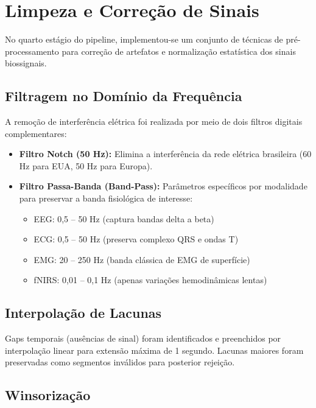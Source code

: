 \section{Limpeza e Correção de Sinais}
\label{sec:metodo_limpeza}

No quarto estágio do pipeline, implementou-se um conjunto de técnicas de pré-processamento para correção de artefatos e normalização estatística dos sinais biossignais.

\subsection{Filtragem no Domínio da Frequência}

A remoção de interferência elétrica foi realizada por meio de dois filtros digitais complementares:

\begin{itemize}
    \item \textbf{Filtro Notch (50 Hz):} Elimina a interferência da rede elétrica brasileira (60 Hz para EUA, 50 Hz para Europa).
    \item \textbf{Filtro Passa-Banda (Band-Pass):} Parâmetros específicos por modalidade para preservar a banda fisiológica de interesse:
    \begin{itemize}
        \item EEG: 0,5 -- 50 Hz (captura bandas delta a beta)
        \item ECG: 0,5 -- 50 Hz (preserva complexo QRS e ondas T)
        \item EMG: 20 -- 250 Hz (banda clássica de EMG de superfície)
        \item fNIRS: 0,01 -- 0,1 Hz (apenas variações hemodinâmicas lentas)
    \end{itemize}
\end{itemize}

\subsection{Interpolação de Lacunas}

Gaps temporais (ausências de sinal) foram identificados e preenchidos por interpolação linear para extensão máxima de 1 segundo. Lacunas maiores foram preservadas como segmentos inválidos para posterior rejeição.

\subsection{Winsorização}

